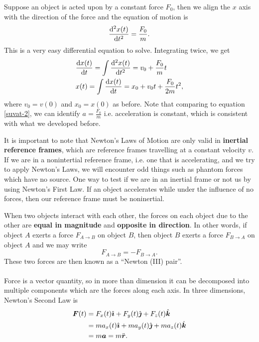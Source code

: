 \documentclass[../classical_mechanics.tex]{subfiles}
\begin{document}
        \begin{example}
            Suppose an object is acted upon by a constant force $F_0$, then we align the $x$ axis with the direction of the force and the equation of motion is
            \begin{equation*}
                \dv[2]{x(t)}{t}=\frac{F_0}{m}.
            \end{equation*}
            This is a very easy differential equation to solve.
            Integrating twice, we get
            \begin{align*}
                &\dv{x(t)}{t}=\int\dv[2]{x(t)}{t}=v_0+\frac{F_0}{m}t\\
                &x(t)=\int\dv{x(t)}{t}=x_0+v_0t+\frac{F_0}{2m}t^2,
            \end{align*}
            where $v_0=v(0)$ and $x_0=x(0)$ as before.
            Note that comparing to equation \ref{suvat-2}, we can identify $a=\frac{F_0}{m}$ i.e. acceleration is constant, which is consistent with what we developed before.
        \end{example}
        It is important to note that Newton's Laws of Motion are only valid in \textbf{inertial reference frames}, which are reference frames travelling at a constant velocity $v$.
        If we are in a nonintertial reference frame, i.e. one that is accelerating, and we try to apply Newton's Laws, we will encounter odd things such as phantom forces which have no source.
        One way to test if we are in an inertial frame or not us by using Newton's First Law.
        If an object accelerates while under the influence of no forces, then our reference frame must be noninertial.
        \begin{definition}
            When two objects interact with each other, the forces on each object due to the other are \textbf{equal in magnitude} and \textbf{opposite in direction}.
            In other words, if object $A$ exerts a force $F_{A\to B}$ on object $B$, then object $B$ exerts a force $F_{B\to A}$ on object $A$ and we may write
            \begin{equation}
                F_{A\to B}=-F_{B\to A}.
            \end{equation}
            These two forces are then known as a ``Newton (III) pair''.
        \end{definition}

        \paragraph{}
        Force is a vector quantity, so in more than dimension it can be decomposed into multiple components which are the forces along each axis.
        In three dimensions, Newton's Second Law is
        \begin{align*}
            \boldsymbol{F}(t)&=F_x(t)\hat{\boldsymbol{\imath}}+F_y(t)\hat{\boldsymbol{\jmath}}+F_z(t)\hat{\boldsymbol{k}}\\
            &=ma_x(t)\hat{\boldsymbol{\imath}}+ma_y(t)\hat{\boldsymbol{\jmath}}+ma_z(t)\hat{\boldsymbol{k}} \\
            &=m\boldsymbol{a}=m\ddot{\boldsymbol{r}}.
        \end{align*}
\end{document}
